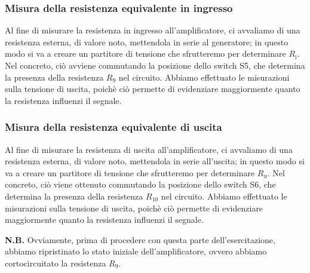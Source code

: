 \documentclass[a4paper]{article}
\begin{document}
			\subsubsection{Misura della resistenza equivalente in ingresso}
				Al fine di misurare la resistenza in ingresso all'amplificatore, ci avvaliamo di una resistenza esterna, di valore noto, mettendola in serie al generatore; in questo modo si va a creare un partitore di tensione che sfrutteremo per determinare $ R_{\mathrm{i}} $.
				\newline
				Nel concreto, ciò avviene commutando la posizione dello switch S5, che determina la presenza della resistenza $ R_{9} $ nel circuito.
				\newline
				Abbiamo effettuato le misurazioni sulla tensione di uscita, poichè ciò permette di evidenziare maggiormente quanto la resistenza influenzi il segnale.
			\subsubsection{Misura della resistenza equivalente di uscita}	
				Al fine di misurare la resistenza di uscita all'amplificatore, ci avvaliamo di una resistenza esterna, di valore noto, mettendola in serie all'uscita; in questo modo si va a creare un partitore di tensione che sfrutteremo per determinare $ R_{\mathrm{u}} $.
				\newline
				Nel concreto, ciò viene ottenuto commutando la posizione dello switch S6, che determina la presenza della resistenza $ R_{10} $ nel circuito.
				\newline
				Abbiamo effettuato le misurazioni sulla tensione di uscita, poichè ciò permette di evidenziare maggiormente quanto la resistenza influenzi il segnale.				
				\newline
				\begin{scriptsize}
					\textbf{N.B.} Ovviamente, prima di procedere con questa parte dell'esercitazione, abbiamo ripristinato lo stato iniziale dell'amplificatore, ovvero abbiamo cortocircuitato la resistenza $ R_{9} $. 
				\end{scriptsize}
\end{document}
